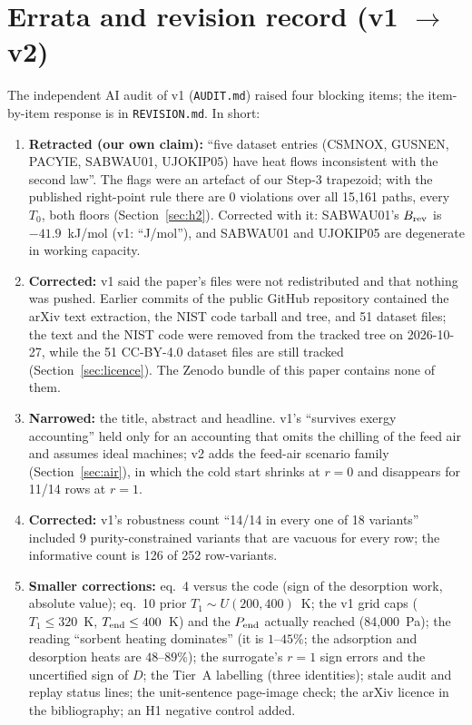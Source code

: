 \documentclass[10pt]{article}
\begin{document}
\section{Errata and revision record (v1 $\to$ v2)}\label{sec:errata}
The independent AI audit of v1 (\texttt{AUDIT.md}) raised four blocking items; the item-by-item response is in \texttt{REVISION.md}. In short:
\begin{enumerate}\itemsep=1pt
\item \textbf{Retracted (our own claim):} ``five dataset entries (CSMNOX, GUSNEN, PACYIE, SABWAU01, UJOKIP05) have heat flows inconsistent with the second law''. The flags were an artefact of our Step-3 trapezoid; with the published right-point rule there are 0 violations over all 15,161 paths, every $T_0$, both floors (Section~\ref{sec:h2}). Corrected with it: SABWAU01's $B_{\rm rev}$ is $-41.9$~kJ/mol (v1: ``J/mol''), and SABWAU01 and UJOKIP05 are degenerate in working capacity.
\item \textbf{Corrected:} v1 said the paper's files were not redistributed and that nothing was pushed. Earlier commits of the public GitHub repository contained the arXiv text extraction, the NIST code tarball and tree, and 51 dataset files; the text and the NIST code were removed from the tracked tree on 2026-10-27, while the 51 CC-BY-4.0 dataset files are still tracked (Section~\ref{sec:licence}). The Zenodo bundle of this paper contains none of them.
\item \textbf{Narrowed:} the title, abstract and headline. v1's ``survives exergy accounting'' held only for an accounting that omits the chilling of the feed air and assumes ideal machines; v2 adds the feed-air scenario family (Section~\ref{sec:air}), in which the cold start shrinks at $r=0$ and disappears for 11/14 rows at $r=1$.
\item \textbf{Corrected:} v1's robustness count ``14/14 in every one of 18 variants'' included 9 purity-constrained variants that are vacuous for every row; the informative count is 126 of 252 row-variants.
\item \textbf{Smaller corrections:} eq.~4 versus the code (sign of the desorption work, absolute value); eq.~10 prior $T_1\sim U(200,400)$~K; the v1 grid caps ($T_1\le320$~K, $T_{\rm end}\le400$~K) and the $P_{\rm end}$ actually reached (84,000~Pa); the reading ``sorbent heating dominates'' (it is $1$--$45\%$; the adsorption and desorption heats are $48$--$89\%$); the surrogate's $r=1$ sign errors and the uncertified sign of $D$; the Tier~A labelling (three identities); stale audit and replay status lines; the unit-sentence page-image check; the arXiv licence in the bibliography; an H1 negative control added.
\end{enumerate}
\end{document}
